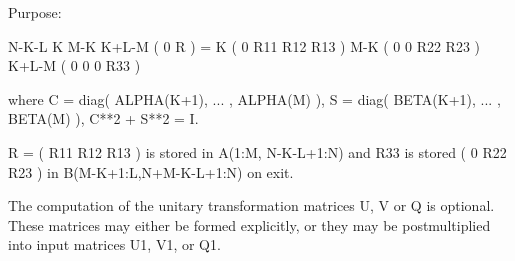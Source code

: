 \begin{DoxyParagraph}{Purpose\+: }
\begin{DoxyVerb}
                N-K-L  K   M-K  K+L-M
 ( 0 R ) =    K ( 0    R11  R12  R13  )
           M-K ( 0     0   R22  R23  )
         K+L-M ( 0     0    0   R33  )

 where
 C = diag( ALPHA(K+1), ... , ALPHA(M) ),
 S = diag( BETA(K+1),  ... , BETA(M) ),
 C**2 + S**2 = I.

 R = ( R11 R12 R13 ) is stored in A(1:M, N-K-L+1:N) and R33 is stored
     (  0  R22 R23 )
 in B(M-K+1:L,N+M-K-L+1:N) on exit.

 The computation of the unitary transformation matrices U, V or Q
 is optional.  These matrices may either be formed explicitly, or they
 may be postmultiplied into input matrices U1, V1, or Q1.\end{DoxyVerb}
 
\end{DoxyParagraph}

